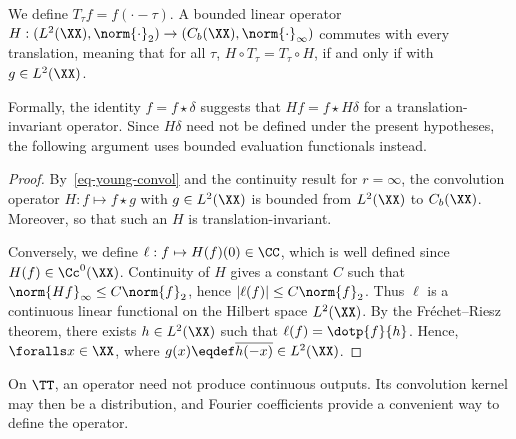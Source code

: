 \begin{prop}
	We define $T_\tau f = f(\cdot-\tau)$.
	A bounded linear operator $H : (L^2(\XX),\norm{\cdot}_2) \rightarrow (C_b(\XX),\norm{\cdot}_\infty)$ commutes with every translation, meaning that for all $\tau$, $H \circ T_\tau = T_\tau \circ H$, if and only if
	with $g \in L^2(\XX)$.
\end{prop}

Formally, the identity $f=f\star\delta$ suggests that $Hf=f\star H\delta$ for a translation-invariant operator. Since $H\delta$ need not be defined under the present hypotheses, the following argument uses bounded evaluation functionals instead.

\begin{proof}
	By~\eqref{eq-young-convol} and the continuity result for $r=\infty$, the convolution operator $H : f \mapsto f \star g$ with $g \in L^2(\XX)$ is bounded from $L^2(\XX)$ to $C_b(\XX)$. Moreover,
	so that such an $H$ is translation-invariant. 
	
	
	Conversely, we define $\ell : f \mapsto H(f)(0) \in \CC$, which is well defined since $H(f) \in \Cc^0(\XX)$.
	Continuity of $H$ gives a constant $C$ such that $\norm{Hf}_\infty \leq C \norm{f}_2$, hence $|\ell(f)| \leq C \norm{f}_2$. Thus $\ell$ is a continuous linear functional on the Hilbert space $L^2(\XX)$. By the Fr\'echet--Riesz theorem, there exists $h \in L^2(\XX)$ such that $\ell(f)=\dotp{f}{h}$.
	Hence, $\foralls x \in \XX$, 
	where $g(x)\eqdef\overline{h(-x)}\in L^2(\XX)$.
\end{proof}

On $\TT$, an operator need not produce continuous outputs. Its convolution kernel may then be a distribution, and Fourier coefficients provide a convenient way to define the operator.

